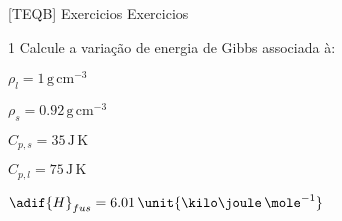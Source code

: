 \documentclass[\mainfilename]{subfiles}
\begin{document}
\graphicspath{{./.build/figures/TEQB-Exercicios_Resolvidos.3}}

[TEQB]
{Exercicios}
{Exercicios}

\setcounter{question}{19}

\setcounter{question}{20}
\begin{questionBox}1{ %
    Calcule a variação de energia de Gibbs associada à:
} %

    \begin{itemize}
        \begin{multicols}{3}
            \item \(\rho_{l} = 1\,\unit{\gram\,\centi\metre^{-3}}\)
            \item \(\rho_{s} = 0.92\,\unit{\gram\,\centi\metre^{-3}}\)
            \item \(C_{p,s} = 35\,\unit{\joule\,\kelvin}\)
            \item \(C_{p,l} = 75\,\unit{\joule\,\kelvin}\)
            \item \(\adif{H}_{fus} = 6.01\,\unit{\kilo\joule\,\mole^{-1}}\)
        \end{multicols}
    \end{itemize}

\end{questionBox}
\end{document}
